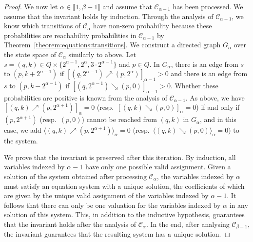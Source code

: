 \documentclass[a4paper,UKenglish,cleveref,autoref,thm-restate,colorlinks]{lipics-v2021}
\newcommand{\integerInterval}[1]{\llbracket{}#1\rrbracket{}}
\newcommand{\graph}{G}
\newcommand{\ocStateSpace}{Q}
\newcommand{\ocState}{q}
\newcommand{\ocStateB}{p}
\newcommand{\ocCount}{k}
\newcommand{\ocConfig}{s}
\newcommand{\mchain}{\mathcal{C}}
\newcommand{\powerIndex}{\alpha}
\newcommand{\powerMax}{\beta}
\newcommand{\upProba}[5]{[(#1,#2)\nearrow{}(#3,#4)]_{#5}}
\newcommand{\downProba}[5]{[(#1,#2)\searrow{}(#3,#4)]_{#5}}
\newcommand{\upProbaVar}[5]{\langle (#1,#2)\nearrow{}(#3,#4)\rangle_{#5}}
\newcommand{\downProbaVar}[5]{\langle (#1,#2)\searrow{}(#3,#4)\rangle_{#5}}
\begin{document}
\begin{proof}
  We now let $\powerIndex\in\integerInterval{1, \powerMax-1}$ and assume that $\mchain_{\powerIndex-1}$ has been processed.
  We assume that the invariant holds by induction.
  Through the analysis of $\mchain_{\powerIndex-1}$, we know which transitions of $\mchain_{\powerIndex}$ have non-zero probability because these probabilities are reachability probabilities in $\mchain_{\powerIndex-1}$ by Theorem~\ref{theorem:equations:transitions}.
  We construct a directed graph $\graph_\powerIndex$ over the state space of $\mchain_\powerIndex$ similarly to above.
  Let $\ocConfig=(\ocState, \ocCount)\in\ocStateSpace\times\{2^{\powerIndex-1}, 2^\powerIndex, 3\cdot2^{\powerIndex-1}\}$ and $\ocStateB\in\ocStateSpace$.
  In $\graph_\powerIndex$, there is an edge from $\ocConfig$ to $(\ocStateB, \ocCount+2^{\powerIndex-1})$ if $\upProba{\ocState}{2^{\powerIndex-1}}{\ocStateB}{2^\powerIndex}{\powerIndex-1}>0$ and there is an edge from $\ocConfig$ to $(\ocStateB, \ocCount-2^{\powerIndex-1})$ if $\downProba{\ocState}{2^{\powerIndex-1}}{\ocStateB}{0}{\powerIndex-1}>0$.
Whether these probabilities are positive is known from the analysis of $\mchain_{\powerIndex-1}$.
  As above, we have $\upProba{\ocState}{\ocCount}{\ocStateB}{2^{\powerIndex+1}}{\powerIndex}=0$ (resp.~$\downProba{\ocState}{\ocCount}{\ocStateB}{0}{\powerIndex}=0$) if and only if $(\ocStateB, 2^{\powerIndex+1})$ (resp.~$(\ocStateB, 0)$) cannot be reached from $(\ocState, \ocCount)$ in $\graph_\powerIndex$, and in this case, we add $\upProbaVar{\ocState}{\ocCount}{\ocStateB}{2^{\powerIndex+1}}{\powerIndex}=0$ (resp.~$\downProbaVar{\ocState}{\ocCount}{\ocStateB}{0}{\powerIndex}=0$) to the system.

  We prove that the invariant is preserved after this iteration.
  By induction, all variables indexed by $\powerIndex-1$ have only one possible valid assignment.
  Given a solution of the system obtained after processing $\mchain_{\powerIndex}$, the variables indexed by $\powerIndex$ must satisfy an equation system with a unique solution, the coefficients of which are given by the unique valid assignment of the variables indexed by $\powerIndex-1$.
  It follows that there can only be one valuation for the variables indexed by $\powerIndex$ in any solution of this system.
  This, in addition to the inductive hypothesis, guarantees that the invariant holds after the analysis of $\mchain_\powerIndex$.
  In the end, after analysing $\mchain_{\powerMax-1}$, the invariant guarantees that the resulting system has a unique solution.


\end{proof}
\end{document}
